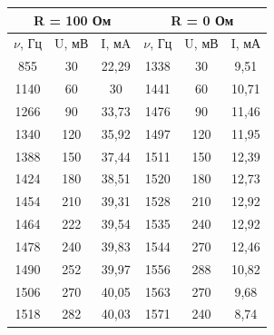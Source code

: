 \documentclass[a4paper, 12pt]{article}
\begin{document}
\begin{table}[h]
	\centering
	\begin{tabular}{|ccc|ccc|}
	\hline
	\multicolumn{3}{|c|}{\textbf{R = 100 Ом}}                         & \multicolumn{3}{c|}{\textbf{R = 0 Ом}}                           \\ \hline
	\multicolumn{1}{|c|}{$\nu$, Гц} & \multicolumn{1}{c|}{U, мВ} & I, мA & \multicolumn{1}{c|}{$\nu$, Гц} & \multicolumn{1}{c|}{U, мВ} & I, мА \\ \hline
	\multicolumn{1}{|c|}{855}    & \multicolumn{1}{c|}{30}    & 22,29 & \multicolumn{1}{c|}{1338}   & \multicolumn{1}{c|}{30}    & 9,51  \\ \hline
	\multicolumn{1}{|c|}{1140}   & \multicolumn{1}{c|}{60}    & 30    & \multicolumn{1}{c|}{1441}   & \multicolumn{1}{c|}{60}    & 10,71 \\ \hline
	\multicolumn{1}{|c|}{1266}   & \multicolumn{1}{c|}{90}    & 33,73 & \multicolumn{1}{c|}{1476}   & \multicolumn{1}{c|}{90}    & 11,46 \\ \hline
	\multicolumn{1}{|c|}{1340}   & \multicolumn{1}{c|}{120}   & 35,92 & \multicolumn{1}{c|}{1497}   & \multicolumn{1}{c|}{120}   & 11,95 \\ \hline
	\multicolumn{1}{|c|}{1388}   & \multicolumn{1}{c|}{150}   & 37,44 & \multicolumn{1}{c|}{1511}   & \multicolumn{1}{c|}{150}   & 12,39 \\ \hline
	\multicolumn{1}{|c|}{1424}   & \multicolumn{1}{c|}{180}   & 38,51 & \multicolumn{1}{c|}{1520}   & \multicolumn{1}{c|}{180}   & 12,73 \\ \hline
	\multicolumn{1}{|c|}{1454}   & \multicolumn{1}{c|}{210}   & 39,31 & \multicolumn{1}{c|}{1528}   & \multicolumn{1}{c|}{210}   & 12,92 \\ \hline
	\multicolumn{1}{|c|}{1464}   & \multicolumn{1}{c|}{222}   & 39,54 & \multicolumn{1}{c|}{1535}   & \multicolumn{1}{c|}{240}   & 12,92 \\ \hline
	\multicolumn{1}{|c|}{1478}   & \multicolumn{1}{c|}{240}   & 39,83 & \multicolumn{1}{c|}{1544}   & \multicolumn{1}{c|}{270}   & 12,46 \\ \hline
	\multicolumn{1}{|c|}{1490}   & \multicolumn{1}{c|}{252}   & 39,97 & \multicolumn{1}{c|}{1556}   & \multicolumn{1}{c|}{288}   & 10,82 \\ \hline
	\multicolumn{1}{|c|}{1506}   & \multicolumn{1}{c|}{270}   & 40,05 & \multicolumn{1}{c|}{1563}   & \multicolumn{1}{c|}{270}   & 9,68  \\ \hline
	\multicolumn{1}{|c|}{1518}   & \multicolumn{1}{c|}{282}   & 40,03 & \multicolumn{1}{c|}{1571}   & \multicolumn{1}{c|}{240}   & 8,74  \\ \hline

\end{tabular}
\end{table}
\end{document}
